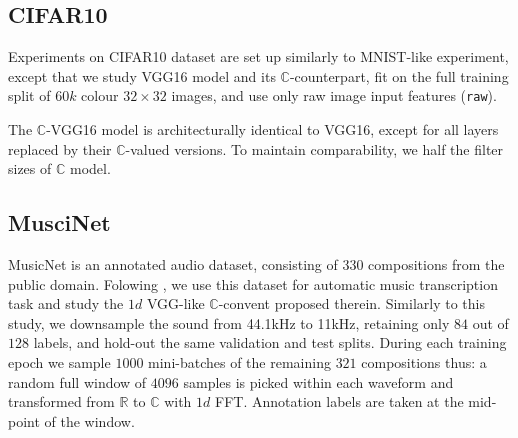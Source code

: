 \documentclass[a4paper,10pt]{article}
\newcommand{\real}{\mathbb{R}}
\newcommand{\cplx}{\mathbb{C}}
\begin{document}


\subsection{CIFAR10} %
\label{sub:cifar10}

Experiments on CIFAR10 dataset are set up similarly to MNIST-like experiment, except
that we study VGG16 model \citep{simonyan_very_2015} and its $\cplx$-counterpart, fit
on the full training split of $60k$ colour $32\times32$ images, and use only raw image
input features (\texttt{raw}).

The $\cplx$-VGG16 model is architecturally identical to VGG16, except for all layers
replaced by their $\cplx$-valued versions. To maintain comparability, we half the filter
sizes of $\cplx$ model.






\subsection{MusciNet} %
\label{sub:muscinet}

MusicNet \citep{thickstun_learning_2017} is an annotated audio dataset, consisting of $330$
compositions from the public domain. Folowing \citet{trabelsi_deep_2017}, we use this
dataset for automatic music transcription task and study the $1d$ VGG-like $\cplx$-convent
proposed therein. Similarly to this study, we downsample the sound from 44.1kHz to 11kHz,
retaining only $84$ out of $128$ labels, and hold-out the same validation and test splits.
During each training epoch we sample $1000$ mini-batches of the remaining $321$ compositions
thus: a random full window of $4096$ samples is picked within each waveform and transformed
from $\real$ to $\cplx$ with $1d$ FFT. Annotation labels are taken at the mid-point of the
window.
\end{document}
